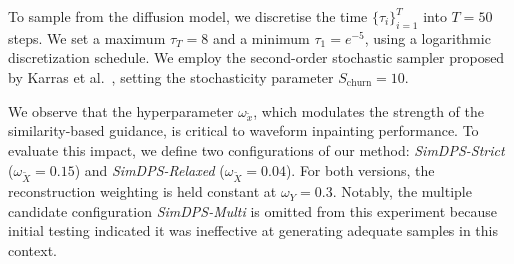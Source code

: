 \documentclass{article}
\begin{document}
To sample from the diffusion model, we discretise the time $\{\tau_i\}_{i=1}^T$ into $T=50$ steps. 
We set a maximum $\tau_T=8$ and a minimum $\tau_1=e^{-5}$, using
a logarithmic discretization schedule.
 We employ the second-order stochastic sampler proposed by Karras et al.~\cite{karras2022elucidating},
 setting the stochasticity parameter $S_{\mathrm{churn}}=10$. 


We observe that the hyperparameter $\omega_{\tilde{x}}$, which modulates the strength of the similarity-based guidance, is critical to waveform inpainting performance. To evaluate this impact, we define two configurations of our method: \textit{SimDPS-Strict} ($\omega_{\tilde{X}} = 0.15$) and \textit{SimDPS-Relaxed} ($\omega_{\tilde{X}} = 0.04$). For both versions, the reconstruction weighting is held constant at $\omega_Y = 0.3$. 
Notably, the multiple candidate configuration \textit{SimDPS-Multi} is omitted from this experiment because initial testing indicated it was ineffective at generating adequate samples in this context.

\end{document}
